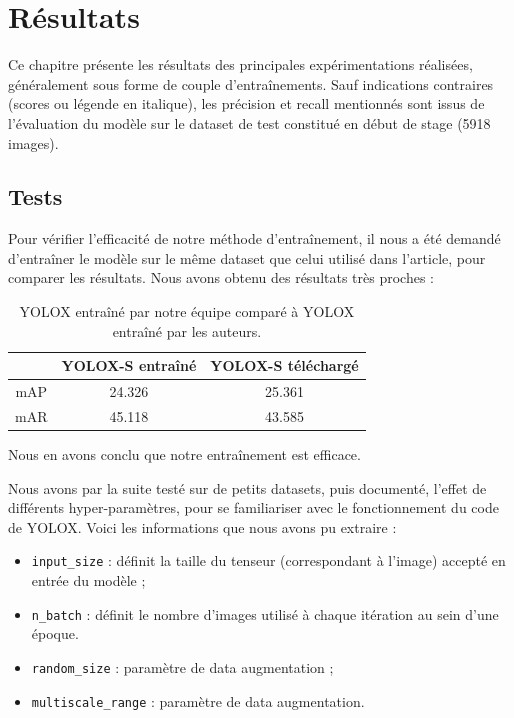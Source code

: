 \chapter{Résultats}\label{resultats}

Ce chapitre présente les résultats des principales expérimentations réalisées, généralement sous forme de couple d'entraînements. Sauf indications contraires (scores ou légende en italique), les précision et recall mentionnés sont issus de l'évaluation du modèle sur le dataset de test constitué en début de stage (5918 images).

\section{Tests}

Pour vérifier l'efficacité de notre méthode d'entraînement, il nous a été demandé d'entraîner le modèle sur le même dataset que celui utilisé
dans l'article, pour comparer les résultats. 
Nous avons obtenu des résultats très proches :

\begin{table}[!h]
    \caption{YOLOX entraîné par notre équipe comparé à YOLOX entraîné par les auteurs.}
\begin{center}
    \begin{tabular}{ c c c }
        \hline
        & YOLOX-S entraîné & YOLOX-S téléchargé \\
        \hline
        mAP & 24.326 & 25.361 \\
        mAR & 45.118 & 43.585
    \end{tabular}
\end{center}
\end{table}

Nous en avons conclu que notre entraînement est efficace.

Nous avons par la suite testé sur de petits datasets, puis documenté,
l'effet de différents hyper-paramètres, pour se familiariser avec le fonctionnement du code de YOLOX. 
Voici les informations que nous avons pu extraire : 

\begin{itemize}
    \item \texttt{input\_size} : définit la taille du tenseur (correspondant à l'image) accepté en entrée du modèle ;
    \item \texttt{n\_batch} : définit le nombre d'images utilisé à chaque itération au sein d'une époque.
    \item \texttt{random\_size} : paramètre de data augmentation ;
    \item \texttt{multiscale\_range} : paramètre de data augmentation.
\end{itemize}

